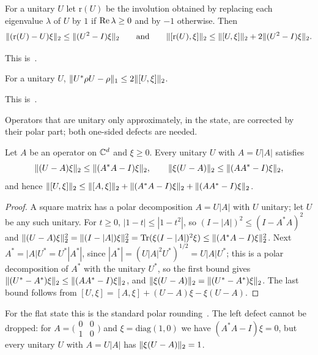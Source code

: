 \begin{lemma}[Rounding]\label{lem:rounding}
For a unitary $U$ let $\mathrm r(U)$ be the involution obtained by replacing each eigenvalue $\lambda$ of $U$ by $1$ if
$\operatorname{Re}\lambda\ge0$ and by $-1$ otherwise. Then
\[
\lVert (\mathrm r(U)-U)\xi\rVert_2\le\lVert (U^2-I)\xi\rVert_2\qquad\text{and}\qquad\lVert [\mathrm r(U),\xi]\rVert_2\le\lVert [U,\xi]\rVert_2+2\lVert (U^2-I)\xi\rVert_2.
\]
\end{lemma}

This is~\cite[Lemma~3.6]{DM-game}.

\begin{lemma}\label{lem:rotate}
For a unitary $U$, $\lVert U^*\rho U-\rho\rVert_1\le2\lVert [U,\xi]\rVert_2$.
\end{lemma}

This is~\cite[Lemma~3.7]{DM-game}.

Operators that are unitary only approximately, in the state, are corrected by their polar part; both one-sided defects
are needed.

\begin{lemma}\label{lem:polar}
Let $A$ be an operator on $\mathbb C^d$ and $\xi\ge0$. Every unitary $U$ with $A=U|A|$ satisfies
\[
\lVert (U-A)\xi\rVert_2\le\lVert (A^*A-I)\xi\rVert_2,\qquad\lVert \xi(U-A)\rVert_2\le\lVert (AA^*-I)\xi\rVert_2,
\]
and hence $\lVert [U,\xi]\rVert_2\le\lVert [A,\xi]\rVert_2+\lVert (A^*A-I)\xi\rVert_2+\lVert (AA^*-I)\xi\rVert_2$.
\end{lemma}

\begin{proof}
A square matrix has a polar decomposition $A=U|A|$ with $U$ unitary; let $U$ be any such unitary. For $t\ge0$, $|1-t|\le|1-t^2|$, so
$(I-|A|)^2\le(I-A^*A)^2$ and $\lVert (U-A)\xi\rVert_2^2=\lVert (I-|A|)\xi\rVert_2^2=\operatorname{Tr}(\xi(I-|A|)^2\xi)\le\lVert (A^*A-I)\xi\rVert_2^2$. Next
$A^*=|A|U^*=U^*|A^*|$, since $|A^*|=(U|A|^2U^*)^{1/2}=U|A|U^*$; this is a polar decomposition of $A^*$ with the unitary $U^*$, so
the first bound gives $\lVert (U^*-A^*)\xi\rVert_2\le\lVert (AA^*-I)\xi\rVert_2$, and $\lVert \xi(U-A)\rVert_2=\lVert (U^*-A^*)\xi\rVert_2$. The last bound follows from
$[U,\xi]=[A,\xi]+(U-A)\xi-\xi(U-A)$.
\end{proof}

For the flat state this is the standard polar rounding~\cite[Lemma~2.8(a)]{SV18}. The left defect cannot be dropped: for
$A=\bigl(\begin{smallmatrix}0&0\\1&0\end{smallmatrix}\bigr)$ and $\xi=\mathrm{diag}(1,0)$ we have $(A^*A-I)\xi=0$, but every
unitary $U$ with $A=U|A|$ has $\lVert \xi(U-A)\rVert_2=1$.

